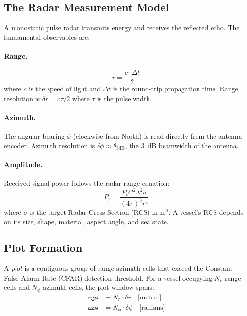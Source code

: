 \documentclass[journal]{IEEEtran}
\begin{document}
\subsection{The Radar Measurement Model}

A monostatic pulse radar transmits energy and receives the reflected echo.
The fundamental observables are:

\paragraph{Range.}
\begin{equation}
  r = \frac{c \cdot \Delta t}{2}
\end{equation}
where $c$ is the speed of light and $\Delta t$ is the round-trip propagation time.
Range resolution is $\delta r = c\tau/2$ where $\tau$ is the pulse width.

\paragraph{Azimuth.}
The angular bearing $\phi$ (clockwise from North) is read directly from the
antenna encoder. Azimuth resolution is $\delta\phi \approx \theta_{3\text{dB}}$,
the 3~dB beamwidth of the antenna.

\paragraph{Amplitude.}
Received signal power follows the radar range equation:
\begin{equation}
  P_r = \frac{P_t G^2 \lambda^2 \sigma}{(4\pi)^3 r^4}
  \label{eq:range_eq}
\end{equation}
where $\sigma$ is the target Radar Cross Section (RCS) in m$^2$.
A vessel's RCS depends on its size, shape, material, aspect angle, and sea state.

\subsection{Plot Formation}

A \emph{plot} is a contiguous group of range-azimuth cells that exceed the
Constant False Alarm Rate (CFAR) detection threshold. For a vessel occupying
$N_r$ range cells and $N_\phi$ azimuth cells, the plot window spans:
\begin{align}
  \texttt{rgw} &= N_r \cdot \delta r \quad \text{[metres]} \label{eq:rgw}\\
  \texttt{azw} &= N_\phi \cdot \delta\phi \quad \text{[radians]} \label{eq:azw}
\end{align}
\end{document}
